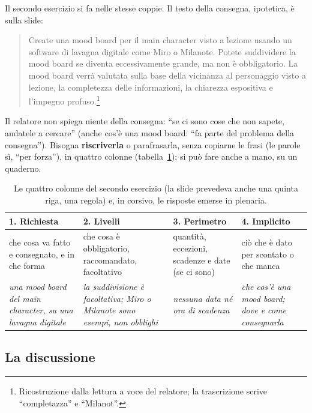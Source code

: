Il secondo esercizio si fa nelle stesse coppie. Il testo della consegna,
ipotetica, è sulla slide:
\begin{quote}
Create una mood board per il main character visto a lezione usando un
software di lavagna digitale come Miro o Milanote. Potete suddividere la mood
board se diventa eccessivamente grande, ma non è obbligatorio. La mood board
verrà valutata sulla base della vicinanza al personaggio visto a lezione, la
completezza delle informazioni, la chiarezza espositiva e l'impegno
profuso.\footnote{Ricostruzione dalla lettura a voce del relatore; la
trascrizione scrive ``completazza'' e ``Milanot''.}
\end{quote}
Il relatore non spiega niente della consegna: ``se ci sono cose che non sapete,
andatele a cercare'' (anche cos'è una mood board: ``fa parte del problema della
consegna''). Bisogna \textbf{riscriverla} o parafrasarla, senza copiarne le
frasi (le parole sì, ``per forza''), in quattro colonne
(tabella~\ref{pt:tab:colonne}); si può fare anche a mano, su un quaderno.

\begin{table}[htbp]
\centering
\small
\begin{tabular}{@{}p{2.8cm}p{3.2cm}p{3.2cm}p{3cm}@{}}
\toprule
\textbf{1. Richiesta} & \textbf{2. Livelli} & \textbf{3. Perimetro} &
\textbf{4. Implicito} \\
\midrule
che cosa va fatto e consegnato, e in che forma & che cosa è obbligatorio,
raccomandato, facoltativo & quantità, eccezioni, scadenze e date (se ci sono)
& ciò che è dato per scontato o che manca \\
\addlinespace
\emph{una mood board del main character, su una lavagna digitale} & \emph{la
suddivisione è facoltativa; Miro o Milanote sono esempi, non obblighi} &
\emph{nessuna data né ora di scadenza} & \emph{che cos'è una mood board; dove e
come consegnarla} \\
\bottomrule
\end{tabular}
\caption{Le quattro colonne del secondo esercizio (la slide prevedeva anche una
quinta riga, una regola) e, in corsivo, le risposte emerse in plenaria.}
\label{pt:tab:colonne}
\end{table}

\subsection{La discussione}

